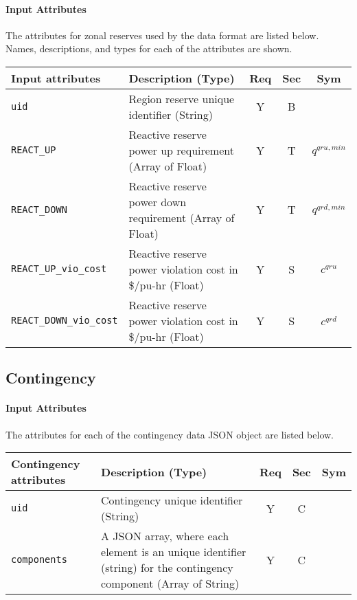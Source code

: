 \documentclass{article}
\begin{document}
\paragraph{Input Attributes}
The attributes for zonal reserves
used by the data format are listed below.
Names, descriptions, and types for each of the attributes are shown.


\begin{center}
\small
\begin{tabular}{ l | l | c | c | c |}
Input attributes & Description (Type) & Req & Sec & Sym\\
\hline
  {\tt uid} & Region reserve unique identifier (String) & Y & B & \\
  \hline
  {\tt REACT\_UP} & Reactive reserve power up requirement (Array of Float)& Y & T & $q^{qru,min}$ \\
  {\tt REACT\_DOWN} & Reactive reserve power down requirement (Array of Float)& Y & T & $q^{qrd,min}$ \\
  \hline
  {\tt REACT\_UP\_vio\_cost} & Reactive reserve power violation cost in \$/pu-hr (Float) & Y & S & $c^{qru}$ \\ 
  {\tt REACT\_DOWN\_vio\_cost} & Reactive reserve power violation cost in \$/pu-hr (Float) & Y & S & $c^{qrd}$ \\
  \hline
\end{tabular}
\end{center}

\subsection{Contingency}    
\label{nom:contingency}

\paragraph{Input Attributes}    
The attributes for each of the contingency data JSON object 
are listed below.

\begin{center}  
\small  
\begin{tabular}{ l | p{3.5in} | c | c | c |}    
    Contingency attributes & Description (Type) & Req & Sec & Sym\\ 
\hline  
    {\tt uid} & Contingency unique identifier (String) & Y & C & \\ 
    {\tt components} & A JSON array, where each element is an unique identifier (string) for the contingency component (Array of String)& Y & C & \\    
  \hline    
\end{tabular}   
\end{center}
\end{document}
